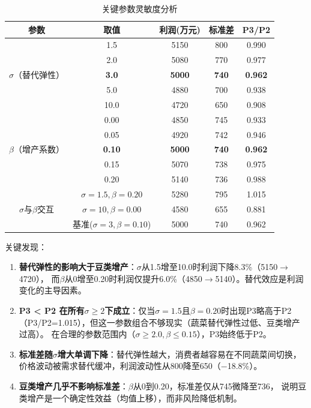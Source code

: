 \documentclass[12pt]{ctexart}
\begin{document}
\begin{table}[H]
\centering
\caption{关键参数灵敏度分析}
\label{tab:sensitivity}
\begin{tabular}{@{}ccccc@{}}
\toprule
\textbf{参数} & \textbf{取值} & \textbf{利润(万元)} & \textbf{标准差} & \textbf{P3/P2} \\
\midrule
\multirow{5}{*}{$\sigma$（替代弹性）} & 1.5 & 5150 & 800 & 0.990 \\
& 2.0 & 5080 & 770 & 0.977 \\
& \textbf{3.0} & \textbf{5000} & \textbf{740} & \textbf{0.962} \\
& 5.0 & 4880 & 700 & 0.938 \\
& 10.0 & 4720 & 650 & 0.908 \\
\midrule
\multirow{5}{*}{$\beta$（增产系数）} & 0.00 & 4850 & 745 & 0.933 \\
& 0.05 & 4920 & 742 & 0.946 \\
& \textbf{0.10} & \textbf{5000} & \textbf{740} & \textbf{0.962} \\
& 0.15 & 5070 & 738 & 0.975 \\
& 0.20 & 5140 & 736 & 0.988 \\
\midrule
\multirow{3}{*}{$\sigma$与$\beta$交互} & $\sigma{=}1.5,\beta{=}0.20$ & 5280 & 795 & 1.015 \\
& $\sigma{=}10,\beta{=}0.00$ & 4580 & 655 & 0.881 \\
& 基准($\sigma{=}3,\beta{=}0.10$) & 5000 & 740 & 0.962 \\
\bottomrule
\end{tabular}
\end{table}

\noindent 关键发现：
\begin{enumerate}[label=(\arabic*), leftmargin=*]
    \item \textbf{替代弹性的影响大于豆类增产}：$\sigma$从1.5增至10.0时利润下降8.3\%（5150$\to$4720），
          而$\beta$从0增至0.20时利润仅提升6.0\%（4850$\to$5140）。替代效应是利润变化的主导因素。
    \item \textbf{P3 < P2 在所有$\sigma\geq2$下成立}：仅当$\sigma=1.5$且$\beta=0.20$时出现P3略高于P2
          （P3/P2=1.015），但这一参数组合不够现实（蔬菜替代弹性过低、豆类增产过高）。
          在合理的参数范围内（$\sigma\geq2.0, \beta\leq0.15$），P3始终低于P2。
    \item \textbf{标准差随$\sigma$增大单调下降}：替代弹性越大，消费者越容易在不同蔬菜间切换，
          价格波动被需求替代缓冲，利润波动性从800降至650（$-$18.8\%）。
    \item \textbf{豆类增产几乎不影响标准差}：$\beta$从0到0.20，标准差仅从745微降至736，
          说明豆类增产是一个确定性效益（均值上移），而非风险降低机制。
\end{enumerate}
\end{document}
